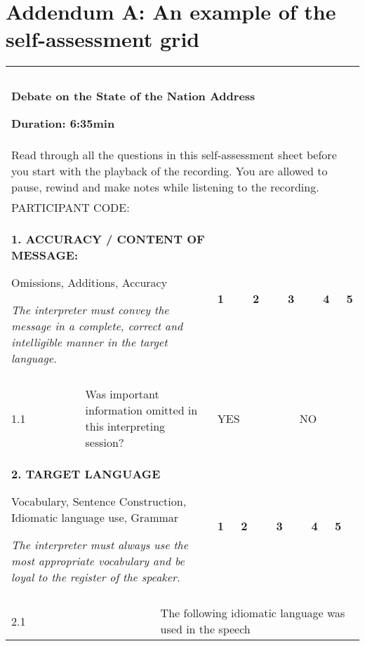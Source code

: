 \documentclass[output=paper]{langsci/langscibook}
\begin{document}
\section*{Addendum A: An example of the self-assessment grid}
\label{03:addendum:A}
\begin{tabularx}{\textwidth}{XXXXXXXXXXXXXXXXXX}
\lsptoprule

\multicolumn{18}{X}{ \textbf{SELF-ASSESSMENT SHEET}\par

}\\
&  &  &  &  &  &  &  &  &  &  &  &  &  &  &  &  & \\
\multicolumn{18}{X}{\textbf{Debate on the State of the Nation Address} 

\textbf{Duration: 6:35min}}\\
\multicolumn{18}{X}{Read through all the questions in this self-assessment sheet before you start with the playback of the recording. You are allowed to pause, rewind and make notes while listening to the recording.} \\
\multicolumn{2}{X}{PARTICIPANT CODE:}  & \multicolumn{16}{X}{}\\
\multicolumn{6}{X}{\textbf{1. ACCURACY / CONTENT OF MESSAGE:} 

Omissions, Additions, Accuracy

\textit{The interpreter must convey the message in a complete, correct and intelligible manner in the target language.}} & \multicolumn{3}{X}{ \textbf{1}} & \multicolumn{3}{X}{ \textbf{2}} & \multicolumn{3}{X}{ \textbf{3}} & \multicolumn{2}{X}{ \textbf{4}} & \textbf{5}\\
\hhline{~~~~~~------------} &  &  &  &  &  & \multicolumn{3}{X}{} & \multicolumn{3}{X}{} & \multicolumn{3}{X}{} & \multicolumn{2}{X}{} & \\
\multicolumn{1}{X}{1.1} & \multicolumn{5}{X}{Was important information omitted in this interpreting session?} & \multicolumn{7}{X}{ YES} & \multicolumn{5}{X}{ NO}\\
\multicolumn{6}{X}{\textbf{2. TARGET LANGUAGE} 

Vocabulary, Sentence Construction, Idiomatic language use, Grammar

\textit{The interpreter must always use the most appropriate vocabulary and be loyal to the register of the speaker.}} & \multicolumn{2}{X}{ \textbf{1}} & \multicolumn{3}{X}{ \textbf{2}} & \multicolumn{3}{X}{ \textbf{3}} & \multicolumn{2}{X}{ \textbf{4}} & \multicolumn{2}{X}{ \textbf{5}}\\
\hhline{~~~~~~------------} &  &  &  &  &  & \multicolumn{2}{X}{} & \multicolumn{3}{X}{} & \multicolumn{3}{X}{} & \multicolumn{2}{X}{} & \multicolumn{2}{X}{}\\
\multicolumn{3}{X}{2.1} & \multicolumn{15}{X}{The following idiomatic language was used in the speech 

}
\end{tabularx}
\end{document}
